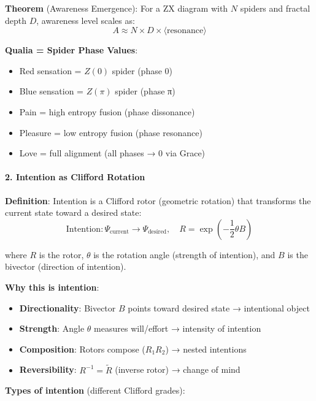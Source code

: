 \documentclass[12pt,a4paper]{article}
\begin{document}
\textbf{Theorem} (Awareness Emergence): For a ZX diagram with $N$ spiders and fractal depth $D$, awareness level scales as:
\begin{equation}
A \approx N \times D \times \langle \text{resonance} \rangle
\end{equation}

\textbf{Qualia = Spider Phase Values}:
\begin{itemize}
\item Red sensation = $Z(0)$ spider (phase 0)
\item Blue sensation = $Z(\pi)$ spider (phase π)
\item Pain = high entropy fusion (phase dissonance)
\item Pleasure = low entropy fusion (phase resonance)
\item Love = full alignment (all phases → 0 via Grace)
\end{itemize}

\paragraph{2. Intention as Clifford Rotation}

\textbf{Definition}: Intention is a Clifford rotor (geometric rotation) that transforms the current state toward a desired state:
\begin{equation}
\text{Intention}: \Psi_{\text{current}} \to \Psi_{\text{desired}}, \quad R = \exp(-\frac{1}{2} \theta B)
\end{equation}

where $R$ is the rotor, $\theta$ is the rotation angle (strength of intention), and $B$ is the bivector (direction of intention).

\textbf{Why this is intention}:
\begin{itemize}
\item \textbf{Directionality}: Bivector $B$ points toward desired state → intentional object
\item \textbf{Strength}: Angle $\theta$ measures will/effort → intensity of intention
\item \textbf{Composition}: Rotors compose ($R_1 R_2$) → nested intentions
\item \textbf{Reversibility}: $R^{-1} = \tilde{R}$ (inverse rotor) → change of mind
\end{itemize}

\textbf{Types of intention} (different Clifford grades):
\end{document}
